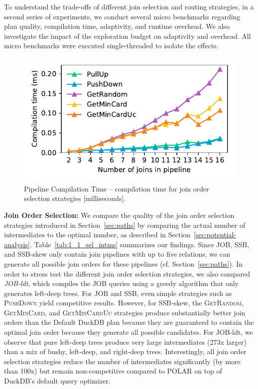To understand the trade-offs of different join selection and routing strategies, in a second series of experiments, we conduct several micro benchmarks regarding plan quality, compilation time, adaptivity, and runtime overhead. We also investigate the impact of the exploration budget on adaptivity and overhead. All micro benchmarks were executed single-threaded to isolate the effects.



\begin{figure}[!t]
    \centering \vspace{-0.1cm}
    \includegraphics[width=\linewidth]{figures/2_2_enumeration_timings.pdf}
		\vspace{-0.75cm}
    \caption{Pipeline Compilation Time -- compilation time for join order selection strategies [milliseconds].}
    \label{fig:2_2_enumeration_timings}
		\vspace{-0.25cm}
\end{figure} 

\textbf{Join Order Selection:} We compare the quality of the join order selection strategies introduced in Section~\ref{sec:paths} by comparing the actual number of intermediates to the optimal number, as described in Section~\ref{sec:potential-analysis}. Table~\ref{tab:1_1_sel_intms} summarizes our findings. Since JOB, SSB, and SSB-skew only contain join pipelines with up to five relations, we can generate all possible join orders for these pipelines (cf. Section~\ref{sec:paths}). In order to stress test the different join order selection strategies, we also compared \textit{JOB-ldt}, which compiles the JOB queries using a greedy algorithm that only generates left-deep trees. For JOB and SSB, even simple strategies such as \textsc{PushDown} yield competitive results. However, for SSB-skew, the \textsc{GetRandom}, \textsc{GetMinCard}, and \textsc{GetMinCardUc} strategies produce substantially better join orders than the Default DuckDB plan because they are guaranteed to contain the optimal join order because they generate all possible candidates. For JOB-ldt, we observe that pure left-deep trees produce very large intermediates (273x larger) than a mix of bushy, left-deep, and right-deep trees. Interestingly, all join order selection strategies reduce the number of intermediates significantly (by more than 100x) but remain non-competitive compared to POLAR on top of DuckDB's default query optimizer.

